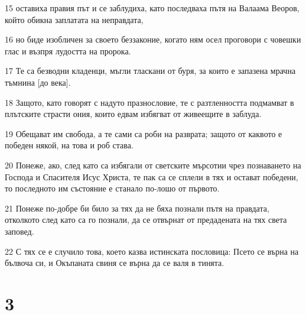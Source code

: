 \par 15 оставиха правия път и се заблудиха, като последваха пътя на Валаама Веоров, който обикна заплатата на неправдата,
\par 16 но биде изобличен за своето беззаконие, когато ням осел проговори с човешки глас и възпря лудостта на пророка.
\par 17 Те са безводни кладенци, мъгли тласкани от буря, за които е запазена мрачна тъмнина [до века].
\par 18 Защото, като говорят с надуто празнословие, те с разтленността подмамват в плътските страсти ония, които едвам избягват от живеещите в заблуда.
\par 19 Обещават им свобода, а те сами са роби на разврата; защото от каквото е победен някой, на това и роб става.
\par 20 Понеже, ако, след като са избягали от светските мърсотии чрез познаването на Господа и Спасителя Исус Христа, те пак са се сплели в тях и остават победени, то последното им състояние е станало по-лошо от първото.
\par 21 Понеже по-добре би било за тях да не бяха познали пътя на правдата, отколкото след като са го познали, да се отвърнат от предадената на тях света заповед.
\par 22 С тях се е случило това, което казва истинската пословица: Псето се върна на бълвоча си, и Окъпаната свиня се върна да се валя в тинята.

\chapter{3}

